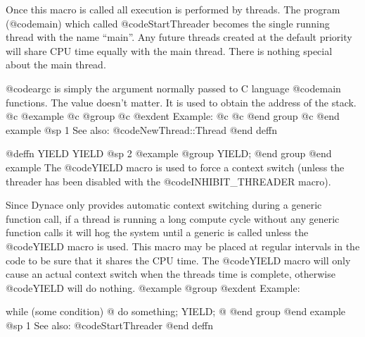 Once this macro is called all execution is performed by threads.  The
program (@code{main}) which called @code{StartThreader} becomes the
single running thread with the name ``main''.  Any future threads
created at the default priority will share CPU time equally with the
main thread.  There is nothing special about the main thread.

@code{argc} is simply the argument normally passed to C language
@code{main} functions.  The value doesn't matter.  It is used to
obtain the address of the stack.
@c @example
@c @group
@c @exdent Example:
@c 
@c @end group
@c @end example
@sp 1
See also:  @code{NewThread::Thread}
@end deffn







@deffn {YIELD} YIELD
@sp 2
@example
@group
YIELD;
@end group
@end example
The @code{YIELD} macro is used to force a context switch (unless the
threader has been disabled with the @code{INHIBIT_THREADER} macro).

Since Dynace only provides automatic context switching during a generic
function call, if a thread is running a long compute cycle without
any generic function calls it will hog the system until a generic is
called unless the @code{YIELD} macro is used.  This macro may be placed
at regular intervals in the code to be sure that it shares the CPU
time.  The @code{YIELD} macro will only cause an actual context
switch when the threads time is complete, otherwise @code{YIELD}
will do nothing.
@example
@group
@exdent Example:

while (some condition)  @{
        do something;
        YIELD;
@}
@end group
@end example
@sp 1
See also:  @code{StartThreader}
@end deffn










